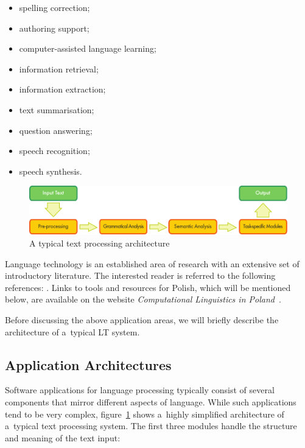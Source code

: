 \begin{multicols}{2}
\begin{itemize} 
  \item spelling correction; 
  \item authoring support;
  \item computer-assisted language learning;
  \item information retrieval;
  \item information extraction;
  \item text summarisation;
  \item question answering;
  \item speech recognition;
  \item speech synthesis.
\end{itemize} 

\begin{figure}[b]  \center
\includegraphics[width=\textwidth]{../_media/english/text_processing_app_architecture}
\caption{A typical text processing architecture} \label{fig:
textprocessingarch_en} 
\end{figure} 

Language technology is an established area of research with an
extensive set of introductory literature. The interested reader is
referred to the following references: \cite{jurafsky-martin01,
manning-schuetze1, lt-world1, lt-survey1, mykowiecka1}. Links to tools
and resources for Polish, which will be mentioned below, are available
on the website \textit{Computational Linguistics in
Poland}~\cite{Clip2}. 

Before discussing the above application areas, we will briefly
describe the architecture of a~typical LT system. 

\subsection{Application Architectures} 

Software applications for language processing typically consist of
several components that mirror different aspects of language. While such applications tend to be very complex, figure~\ref{fig:
textprocessingarch_en} shows a~highly simplified architecture of
a~typical text processing system. The first three modules handle the
structure and meaning of the text input: 


\end{multicols}
